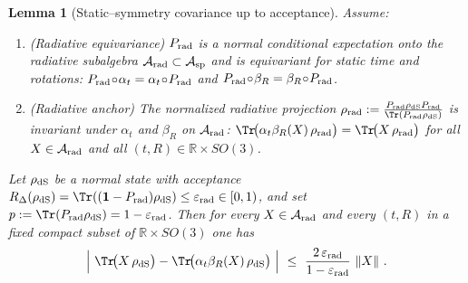 \documentclass[10pt]{article}
\theoremstyle{definition}
\theoremstyle{plain}
\newtheorem{lemma}{Lemma}[section]
\begin{document}
\begin{lemma}[Static–symmetry covariance up to acceptance]\label{lem:static-cov-accept}
Assume:
\begin{enumerate}[leftmargin=1.8em,label=(S\arabic*)]
\item (\emph{Radiative equivariance}) $P_{\rm rad}$ is a normal conditional expectation onto the radiative subalgebra
$\mathcal A_{\rm rad}\subset\mathcal A_{\rm sp}$ and is equivariant for static time and rotations:
$P_{\rm rad}\!\circ\!\alpha_t=\alpha_t\!\circ\!P_{\rm rad}$ and $P_{\rm rad}\!\circ\!\beta_R=\beta_R\!\circ\!P_{\rm rad}$.
\item (\emph{Radiative anchor}) The normalized radiative projection
\(
\rho_{\rm rad}:=\frac{P_{\rm rad}\rho_{\rm dS}P_{\rm rad}}{\Tr(P_{\rm rad}\rho_{\rm dS})}
\)
is invariant under $\alpha_t$ and $\beta_R$ on $\mathcal A_{\rm rad}$:
\(
\Tr\!\big(\alpha_t\beta_R(X)\,\rho_{\rm rad}\big)=\Tr\!\big(X\,\rho_{\rm rad}\big)
\)
for all $X\in\mathcal A_{\rm rad}$ and all $(t,R)\in\mathbb R\times SO(3)$.
\end{enumerate}
Let $\rho_{\rm dS}$ be a normal state with \emph{acceptance} $R_\Delta(\rho_{\rm dS})=\Tr((\mathbf 1-P_{\rm rad})\rho_{\rm dS})\le \varepsilon_{\rm rad}\in[0,1)$, and set
$p:=\Tr(P_{\rm rad}\rho_{\rm dS})=1-\varepsilon_{\rm rad}$. Then for every $X\in\mathcal A_{\rm rad}$ and every $(t,R)$ in a fixed compact subset of $\mathbb R\times SO(3)$ one has
\begin{equation}\label{eq:static-cov-bound}
\Big|\ \Tr\!\big(X\,\rho_{\rm dS}\big) - \Tr\!\big(\alpha_t\beta_R(X)\,\rho_{\rm dS}\big)\ \Big|
\ \le\ \frac{2\,\varepsilon_{\rm rad}}{1-\varepsilon_{\rm rad}}\ \|X\|\ .
\end{equation}
\end{lemma}
\end{document}
